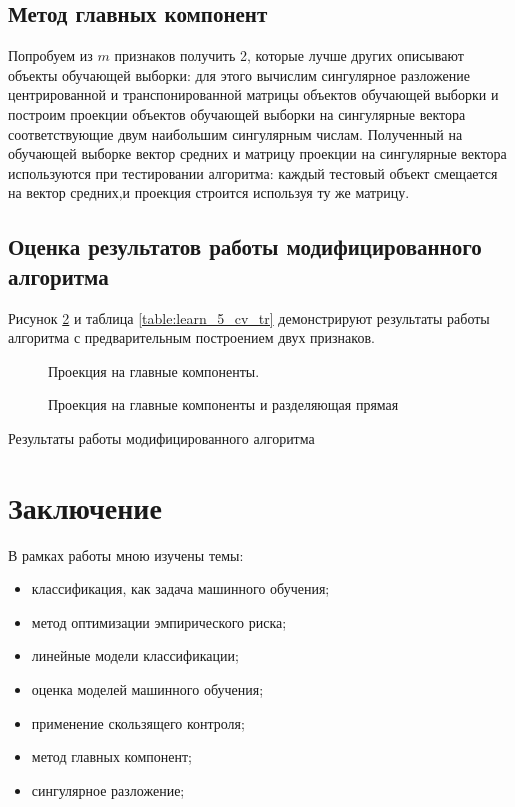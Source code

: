 \documentclass[%
bachelor,    %
subf,        %
href,        %
colorlinks,  %
]{disser}
\begin{document}
\subsection{Метод главных компонент}
Попробуем из $m$ признаков получить 2, которые лучше других описывают объекты обучающей выборки:
для этого вычислим сингулярное разложение центрированной и транспонированной матрицы объектов обучающей выборки и построим проекции объектов обучающей выборки на сингулярные вектора соответствующие двум наибольшим сингулярным числам.\cite{ssa}
Полученный на обучающей выборке вектор средних и матрицу проекции на сингулярные вектора используются при тестировании алгоритма: каждый тестовый объект смещается на вектор средних,и проекция строится используя ту же матрицу.

\subsection{Оценка результатов работы модифицированного алгоритма}

Рисунок \ref{fig:learn_5} и таблица \ref{table:learn_5_cv_tr} демонстрируют результаты работы алгоритма с предварительным построением двух признаков.
\begin{figure}
	\centering		
	
	\caption{Проекция на главные компоненты.}
	\label{fig:scatter_5}
\end{figure}
\begin{figure}
	\centering		
	
	\caption{Проекция на главные компоненты и разделяющая прямая}
	\label{fig:learn_5}
\end{figure}

\begin{table}{}	
	\centering
	\caption{Результаты работы модифицированного алгоритма}	
	
	\label{table:learn_5_cv_tr}
\end{table}


\section{Заключение}
В рамках работы мною изучены темы:
\begin{itemize}
	\item классификация, как задача машинного обучения;
	\item метод оптимизации эмпирического риска;
	\item линейные модели классификации;
	\item оценка моделей машинного обучения;
	\item применение скользящего контроля;
	\item метод главных компонент;
	\item сингулярное разложение;
\end{itemize}


\printbibliography[heading=bibintoc]

\appendix
\end{document}
